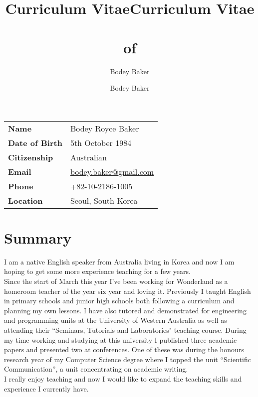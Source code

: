 \documentclass[10pt, a4paper]{report}
\title{Curriculum Vitae}
\author{Bodey Baker}
\title{Curriculum Vitae\\~\\of}
\author{Bodey Baker}%
\newcommand{\sk}[3]{\subsubsection*{#1} {#2}{#3}}
\begin{document}
\begin{minipage}{13cm}
\begin{tabular}{ll}
{\bf Name} & Bodey Royce Baker \\ 
{\bf Date of Birth} & 5th October 1984 \\
{\bf Citizenship} & Australian \\
{\bf Email} & \href{mailto:bodey.baker@gmail.com}{bodey.baker@gmail.com} \\
{\bf Phone} & +82-10-2186-1005 \\
{\bf Location} & Seoul, South Korea \\
\end{tabular}
\section*{Summary}
I am a native English speaker from Australia living in Korea and now I am hoping to get some more experience teaching for a few years. \\

Since the start of March this year I've been working for Wonderland as a homeroom teacher of the year six year and loving it. Previously I taught English in primary schools and junior high schools both following a curriculum and planning my own lessons. I have also tutored and demonstrated for engineering and programming units at the University of Western Australia as well as attending their ``Seminars, Tutorials and Laboratories" teaching course. During my time working and studying at this university I published three academic papers and presented two at conferences. One of these was during the honours research year of my Computer Science degree where I topped the unit ``Scientific Communication'', a unit concentrating on academic writing. \\

I really enjoy teaching and now I would like to expand the teaching skills and experience I currently have.
\end{minipage}
\hfill
\begin{minipage}{50mm}
{%
\setlength{\fboxsep}{0pt}%
\setlength{\fboxrule}{1pt}%
%
}%
\end{minipage}
\end{document}
